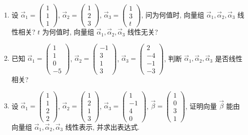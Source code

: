 \begin{enumerate}
	
	\item 设 $\vec{\alpha}_1 = \begin{pmatrix} 1 \\ 1 \\ 1 \end{pmatrix}$, $\vec{\alpha}_2 = \begin{pmatrix} 1 \\ 2 \\ 3 \end{pmatrix}$, $\vec{\alpha}_3 = \begin{pmatrix} 1 \\ 3 \\ t \end{pmatrix}$, 问为何值时, 向量组 $\vec{\alpha}_1, \vec{\alpha}_2, \vec{\alpha}_3$ 线性相关?
	$t$ 为何值时, 向量组 $\vec{\alpha}_1, \vec{\alpha}_2, \vec{\alpha}_3$ 线性无关?
	
	
	\item 已知 $\vec{\alpha}_1 = \begin{pmatrix} 1 \\ 1 \\ 0 \\ -5 \end{pmatrix}$, $\vec{\alpha}_2 = \begin{pmatrix} -1 \\ 3 \\ 1 \\ 3 \end{pmatrix}$, $\vec{\alpha}_3 = \begin{pmatrix} 2 \\ -4 \\ -1 \\ -3 \end{pmatrix}$, 判断 $\vec{\alpha}_1, \vec{\alpha}_2, \vec{\alpha}_3$ 是否线性相关?
	
	
	\item 设 $\vec{\alpha}_1 = \begin{pmatrix} 1 \\ 1 \\ 2 \\ 2 \end{pmatrix}$, $\vec{\alpha}_2 = \begin{pmatrix} 1 \\ 2 \\ 1 \\ 3 \end{pmatrix}$, $\vec{\alpha}_3 = \begin{pmatrix} 1 \\ -1 \\ 4 \\ 0 \end{pmatrix}$, $\vec{\beta} = \begin{pmatrix} 1 \\ 0 \\ 3 \\ 1 \end{pmatrix}$, 证明向量 $\vec{\beta}$ 能由向量组
	$\vec{\alpha}_1, \vec{\alpha}_2, \vec{\alpha}_3$ 线性表示, 并求出表达式.
	

\end{enumerate}
